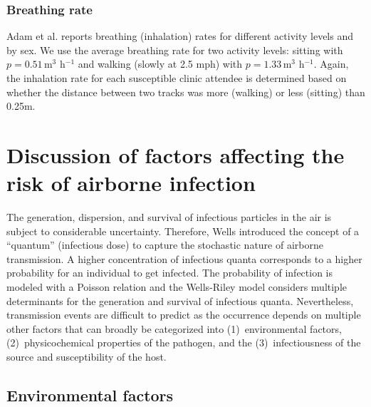 \documentclass[fleqn,11pt]{wlscirep_supp}
\begin{document}
\subsubsection{Breathing rate}

Adam et al.\cite{Adams1993} reports breathing (inhalation) rates for different activity levels and by sex. We use the average breathing rate for two activity levels: sitting with $p = 0.51$\,m$^3$ h$^{-1}$ and walking (slowly at 2.5 mph) with $p = 1.33$\,m$^3$ h$^{-1}$. Again, the inhalation rate for each susceptible clinic attendee is determined based on whether the distance between two tracks was more (walking) or less (sitting) than 0.25m. 

\clearpage

\section{Discussion of factors affecting the risk of airborne infection}\label{sec:depth-discussion}


The generation, dispersion, and survival of infectious particles in the air is subject to considerable uncertainty. Therefore, Wells\cite{Wells1955} introduced the concept of a ``quantum'' (infectious dose) to capture the stochastic nature of airborne transmission. A higher concentration of infectious quanta corresponds to a higher probability for an individual to get infected. The probability of infection is modeled with a Poisson relation and the Wells-Riley model considers multiple determinants for the generation and survival of infectious quanta. Nevertheless, transmission events are difficult to predict as the occurrence depends on multiple other factors that can broadly be categorized into (1)~environmental factors, (2)~physicochemical properties of the pathogen, and the (3)~infectiousness of the source and susceptibility of the host. 

\subsection{Environmental factors}
\end{document}
